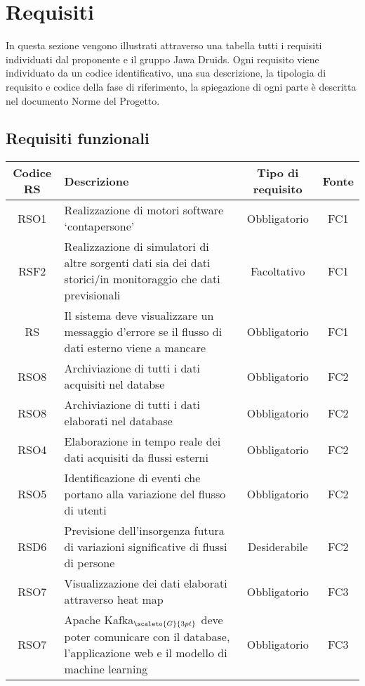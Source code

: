 \chapter{Requisiti}
In questa sezione vengono illustrati attraverso una tabella tutti i requisiti individuati dal proponente e il gruppo Jawa Druids. Ogni requisito viene individuato da un codice identificativo, una sua descrizione, la tipologia di requisito e codice della fase di riferimento, la spiegazione di ogni parte è descritta nel documento Norme del Progetto. 
\section{Requisiti funzionali}



\def\tabularxcolumn#1{m{#1}}
{
	
	\begin{center}
		\renewcommand{\arraystretch}{1.4}
		\begin{tabularx}{\textwidth}{ |c|X|c|c| }
			\hline
			\rowcolor{Melon}
			\textbf{Codice RS} & \textbf{Descrizione} & \textbf{Tipo di requisito} & \textbf{Fonte} \\
			\hline
			RSO1 & Realizzazione di motori software ‘contapersone’  & Obbligatorio & FC1  \\
			\hline
			RSF2 & Realizzazione di simulatori di altre sorgenti dati sia dei dati storici/in monitoraggio che dati previsionali & Facoltativo & FC1 \\
			\hline
			RS  & Il sistema deve visualizzare un messaggio d'errore se il flusso di dati esterno viene a mancare  & Obbligatorio & FC1 \\
			\hline
			RSO8 & Archiviazione di tutti i dati acquisiti nel databse & Obbligatorio & FC2  \\
				\hline
				RSO8 & Archiviazione di tutti i dati elaborati nel database & Obbligatorio & FC2  \\

			\hline
			RSO4 & Elaborazione in tempo reale dei dati acquisiti da flussi esterni & Obbligatorio & FC2  \\
			\hline
			RSO5 & Identificazione di eventi che portano alla variazione del flusso di utenti & Obbligatorio & FC2  \\
			\hline
			RSD6 & Previsione dell'insorgenza futura di variazioni significative di flussi di persone & Desiderabile & FC2  \\
			\hline
			RSO7 & Visualizzazione dei dati elaborati attraverso heat map & Obbligatorio & FC3  \\
		\hline
			RSO7 & Apache Kafka$_{\scaleto{G}{3pt}}$ deve poter comunicare con il database, l'applicazione web e il modello di machine learning  & Obbligatorio & FC3  \\		
			\hline
	\end{tabularx}
	\end{center}

}

